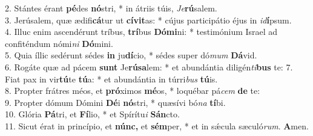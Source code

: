 2. Stántes érant \textbf{pé}des \textbf{nó}stri, * in átriis túis, \thinspace\textit{Je}\textbf{rú}salem.\\
3. Jerúsalem, quæ ædifi\textbf{cá}tur ut \textbf{cívit}as: * cújus participátio éjus in \textit{id}\textbf{í}psum.\\
4. Illuc enim ascendérunt tríbus, \textbf{trí}bus \textbf{Dómi}ni: * testimónium Israel ad confiténdum nómi\textit{ni} \textbf{Dó}mini.\\
5. Quia íllic sedérunt sédes \textbf{in} ju\textbf{dí}cio, * sédes super dó\textit{mum} \textbf{Dá}vid.\\
6. Rogáte quæ ad pácem \textbf{sunt} Je\textbf{rúsa}lem: * et abundántia diligén\textit{ti}\textbf{bus} te:
7. Fiat pax in vir\textbf{tú}te \textbf{tú}a: * et abundántia in túrri\textit{bus} \textbf{tú}is.\\
8. Propter frátres méos, et \textbf{pró}ximos \textbf{mé}os, * loquébar pá\textit{cem} \textbf{de} te:\\
9. Propter dómum Dómini \textbf{Dé}i \textbf{nó}stri, * quæsívi bó\textit{na} \textbf{tí}bi.\\
10. Glória \textbf{Pá}tri, et \textbf{Fí}lio, * et Spírítu\textit{i} \textbf{Sán}cto.\\
11. Sicut érat in princípio, et \textbf{núnc,} et \textbf{sém}per, * et in sǽcula sæculó\textit{rum}. \textbf{A}men.